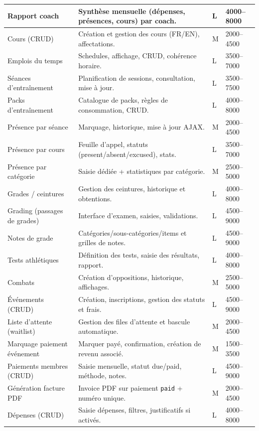 \documentclass[12pt, a4paper]{article}
\begin{document}
\begin{longtable}{|p{4.2cm}|p{8.2cm}|p{1.6cm}|p{2.0cm}|}
\hline
Rapport coach & Synthèse mensuelle (dépenses, présences, cours) par coach. & L & 4000--8000 \\
\hline
Cours (CRUD) & Création et gestion des cours (FR/EN), affectations. & M & 2000--4500 \\
\hline
Emplois du temps & Schedules, affichage, CRUD, cohérence horaire. & L & 3500--7000 \\
\hline
Séances d'entraînement & Planification de sessions, consultation, mise à jour. & L & 3500--7500 \\
\hline
Packs d'entraînement & Catalogue de packs, règles de consommation, CRUD. & L & 4000--8000 \\
\hline
Présence par séance & Marquage, historique, mise à jour AJAX. & M & 2000--4500 \\
\hline
Présence par cours & Feuille d'appel, statuts (present/absent/excused), stats. & L & 3500--7000 \\
\hline
Présence par catégorie & Saisie dédiée + statistiques par catégorie. & M & 2500--5000 \\
\hline
Grades / ceintures & Gestion des ceintures, historique et obtentions. & L & 4000--8000 \\
\hline
Grading (passages de grades) & Interface d'examen, saisies, validations. & L & 4500--9000 \\
\hline
Notes de grade & Catégories/sous-catégories/items et grilles de notes. & L & 4500--9000 \\
\hline
Tests athlétiques & Définition des tests, saisie des résultats, rapport. & L & 4000--8000 \\
\hline
Combats & Création d'oppositions, historique, affichages. & M & 2500--5000 \\
\hline
Événements (CRUD) & Création, inscriptions, gestion des statuts et frais. & L & 4500--9000 \\
\hline
Liste d'attente (waitlist) & Gestion des files d'attente et bascule automatique. & M & 2000--4500 \\
\hline
Marquage paiement événement & Marquer payé, confirmation, création de revenu associé. & M & 1500--3500 \\
\hline
Paiements membres (CRUD) & Saisie mensuelle, statut due/paid, méthode, notes. & L & 4500--9000 \\
\hline
Génération facture PDF & Invoice PDF sur paiement \texttt{paid} + numéro unique. & M & 2000--4500 \\
\hline
Dépenses (CRUD) & Saisie dépenses, filtres, justificatifs si activés. & L & 4000--8000 \\

\end{longtable}
\end{document}
